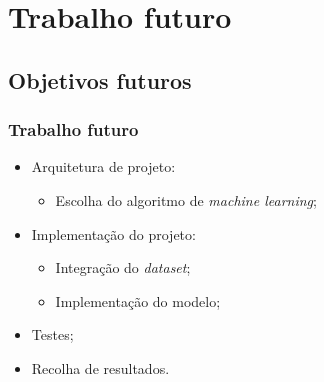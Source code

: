 \documentclass{beamer}
\begin{document}
\section[Trabalho futuro]{Trabalho futuro}
\subsection{Objetivos futuros}
\begin{frame}
\frametitle{Trabalho futuro}

\begin{itemize}
	\item Arquitetura de projeto:
		  \begin{itemize}
			  \item Escolha do algoritmo de \textit{machine learning};
		  \end{itemize} 
	\item Implementação do projeto:
		  \begin{itemize}
		      \item Integração do \textit{dataset};
		      \item Implementação do modelo;
		  \end{itemize}
	\item Testes;
	\item Recolha de resultados.
\end{itemize}

\end{frame}
\end{document}

